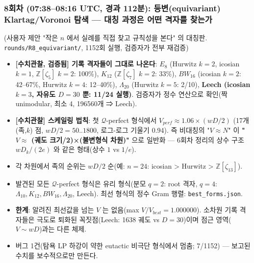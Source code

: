 \hypertarget{uxd68cuxcc28-07380816-utc-uxacbduxacfc-112uxbd84-uxb4f1uxbcc0equivariant-klartagvoronoi-uxd0d0uxc0c9-uxb300uxce6d-uxacfcuxc815uxc740-uxc5b4uxb5a4-uxaca9uxc790uxb97c-uxcc3euxb294uxac00}{%
\subsubsection*{8회차 (07:38--08:16 UTC, 경과 112분): 등변(equivariant) Klartag/Voronoi 탐색 --- 대칭 과정은 어떤 격자를 찾는가}\label{uxd68cuxcc28-07380816-utc-uxacbduxacfc-112uxbd84-uxb4f1uxbcc0equivariant-klartagvoronoi-uxd0d0uxc0c9-uxb300uxce6d-uxacfcuxc815uxc740-uxc5b4uxb5a4-uxaca9uxc790uxb97c-uxcc3euxb294uxac00}}

(사용자 제안 "작은 \(n\) 에서 실례를 직접 찾고 규칙성을 본다" 의 대칭판. \texttt{rounds/R8\_equivariant/}, 1152회 실행, 검증자가 전부 재검증)

\begin{itemize}
\tightlist
\item
  \textbf{{[}수치관찰, 검증됨{]} 기록 격자들이 그대로 나온다}: \(E_8\) (Hurwitz \(k=2\), icosian \(k=1\), \(\mathbb Z[\zeta_5]\) \(k=2\): 100\%), \(K_{12}\) (\(\mathbb Z[\zeta_7]\) \(k=2\): 33\%), \(BW_{16}\) (icosian \(k=2\): 42--67\%, Hurwitz \(k=4\): 12--40\%), \(\Lambda_{20}\) (Hurwitz \(k=5\): 2/10), \textbf{Leech (icosian \(k=3\), 자유도 \(D=30\) 뿐: 11/24 실행)}. 검증자가 정수 연산으로 확인(짝 unimodular, 최소 4, 196560개 ⇒ Leech).
\item
  \textbf{{[}수치관찰{]} 스케일링 법칙}: 첫 \(\mathcal Q\)-perfect 형식에서 \(V_{perf}\approx1.06\times(wD/2)\) (17개 (족,\(k\)) 점, \(wD/2=50..1800\), 로그-로그 기울기 0.94). 즉 비대칭의 "\(V\approx N\)" 이 \textbf{"\(V\approx\) (궤도 크기/2)×(불변형식 차원)"} 으로 일반화 --- 6회차 정리의 상수 구조 \(wD_k/(2e)\) 와 같은 형태(상수 \(1\) vs \(1/e\)).
\item
  각 차원에서 족의 순위는 \(wD/2\) 순(예: \(n=24\): icosian \textgreater{} Hurwitz \textgreater{} \(\mathbb Z[\zeta_{13}]\)).
\item
  발견된 모든 \(\mathcal Q\)-perfect 형식은 유리 형식(분모 \(q=2\): root 격자, \(q=4\): \(\Lambda_{10},K_{12},BW_{16},\Lambda_{20}\), Leech). 최선 형식의 정수 Gram 행렬: \texttt{best\_forms.json}.
\item
  \textbf{한계}: 알려진 최선값을 넘는 \(V\) 는 없음(max \(V/V_{best}=1.000000\)). 소차원 기록 격자들은 극도로 퇴화된 꼭짓점(Leech: 1638 궤도 vs \(D=30\))이며 점근 영역(\(V\sim wD\))과는 다른 체제.
\item
  버그 1건(탐욕 LP 하강이 약한 eutactic 비극단 형식에서 멈춤; 7/1152) --- 보고된 수치를 보수적으로만 만든다.
\end{itemize}

